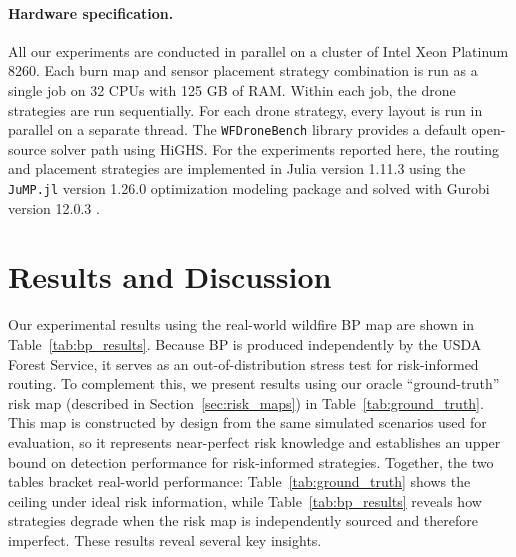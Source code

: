 \documentclass{article}
\begin{document}
\paragraph{Hardware specification.} All our experiments are conducted in parallel on a cluster of Intel Xeon Platinum 8260. Each burn map and sensor placement strategy combination is run as a single job on 32 CPUs with 125 GB of RAM. Within each job, the drone strategies are run sequentially. For each drone strategy, every layout is run in parallel on a separate thread. The \texttt{WFDroneBench} library provides a default open-source solver path using HiGHS. For the experiments reported here, the routing and placement strategies are implemented in Julia version 1.11.3 using the \texttt{JuMP.jl} version 1.26.0 optimization modeling package and solved with Gurobi version 12.0.3 \citep{Gurobi}.


\section{Results and Discussion} \label{sec:results}


Our experimental results using the real-world wildfire BP map are shown in Table~\ref{tab:bp_results}. Because BP is produced independently by the USDA Forest Service, it serves as an out-of-distribution stress test for risk-informed routing. To complement this, we present results using our oracle ``ground-truth'' risk map (described in Section~\ref{sec:risk_maps}) in Table~\ref{tab:ground_truth}. This map is constructed by design from the same simulated scenarios used for evaluation, so it represents near-perfect risk knowledge and establishes an upper bound on detection performance for risk-informed strategies. Together, the two tables bracket real-world performance: Table~\ref{tab:ground_truth} shows the ceiling under ideal risk information, while Table~\ref{tab:bp_results} reveals how strategies degrade when the risk map is independently sourced and therefore imperfect. These results reveal several key insights.
\end{document}
